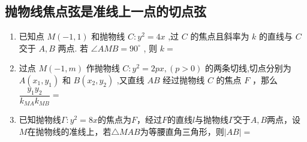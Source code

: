 \subsection*{抛物线焦点弦是准线上一点的切点弦}
\begin{enumerate}
    \item 已知点 $M\left( {-1,1}\right)$ 和抛物线 $C : {y}^2 = {4x}$ ,过 $C$ 的焦点且斜率为 $k$ 的直线与 $C$ 交于 $A,B$ 两点. 若 $\angle {AMB} = {90}^{ \circ  }$ , 则 $k =$ 

    \item 过点 $M\left( {-1,m}\right)$ 作抛物线 $C : {y}^2 = {2px},\left( {p > 0}\right)$ 的两条切线,切点分别为 $A\left( {{x}_1,{y}_1}\right)$ 和 $B\left( {{x}_2,{y}_2}\right)$ ,又直线 ${AB}$ 经过抛物线 $C$ 的焦点 $F$ ，那么 $\dfrac{{y}_1{y}_2}{{k}_{MA}{k}_{MB}} =$ 

    \item 已知抛物线$\Gamma: y^2 = 8x$的焦点为$F$，经过$F$的直线$l$与抛物线$\Gamma$交于$A, B$两点，设$M$在抛物线的准线上，若$\triangle MAB$为等腰直角三角形，则$|AB| = $
    \begin{jieda}
    \end{jieda}
\end{enumerate}
